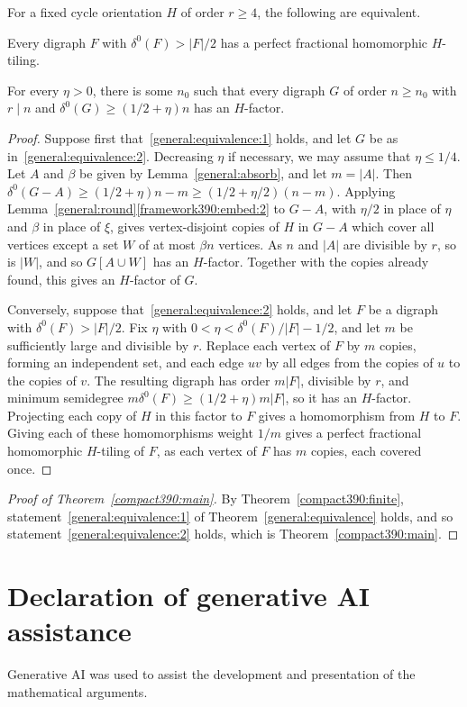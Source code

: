 \begin{theorem}\label{general:equivalence}
For a fixed cycle orientation $H$ of order $r\ge4$, the following
are equivalent.
\begin{props}
\item\label{general:equivalence:1} Every digraph $F$ with $\delta^0(F)>|F|/2$ has a perfect
fractional homomorphic $H$-tiling.
\item\label{general:equivalence:2} For every $\eta>0$, there is some $n_0$ such that every digraph $G$ of
order $n\ge n_0$ with $r\mid n$ and $\delta^0(G)\ge(1/2+\eta)n$ has an
$H$-factor.
\end{props}
\end{theorem}
\begin{proof}
Suppose first that~\ref{general:equivalence:1} holds, and let $G$ be as in~\ref{general:equivalence:2}. Decreasing $\eta$ if necessary, we may assume that $\eta\le1/4$. Let $A$ and $\beta$ be given by Lemma~\ref{general:absorb}, and let $m=|A|$. Then
$\delta^0(G-A)\ge(1/2+\eta)n-m\ge(1/2+\eta/2)(n-m)$.
Applying Lemma~\ref{general:round}\ref{framework390:embed:2} to $G-A$, with $\eta/2$ in place of $\eta$ and $\beta$ in place of $\xi$, gives vertex-disjoint copies of $H$ in $G-A$ which cover all vertices except a set $W$ of at most $\beta n$ vertices. As $n$ and $|A|$ are divisible by $r$, so is $|W|$, and so $G[A\cup W]$ has an $H$-factor. Together with the copies already found, this gives an $H$-factor of $G$.

Conversely, suppose that~\ref{general:equivalence:2} holds, and let $F$ be a digraph with $\delta^0(F)>|F|/2$. Fix $\eta$ with $0<\eta<\delta^0(F)/|F|-1/2$, and let $m$ be sufficiently large and divisible by $r$. Replace each
vertex of $F$ by $m$ copies, forming an independent set, and each edge $uv$ by all edges from the copies of $u$ to the copies of $v$. The resulting digraph has order $m|F|$, divisible by $r$, and minimum semidegree $m\delta^0(F)\ge(1/2+\eta)m|F|$, so it has an $H$-factor. Projecting each copy of $H$ in this factor to $F$ gives a homomorphism from $H$ to $F$. Giving each of these homomorphisms weight $1/m$ gives a perfect fractional homomorphic $H$-tiling of $F$, as each vertex of $F$ has $m$ copies, each covered once.
\end{proof}

\begin{proof}[Proof of Theorem~\ref{compact390:main}]
By Theorem~\ref{compact390:finite}, statement~\ref{general:equivalence:1} of Theorem~\ref{general:equivalence} holds, and so statement~\ref{general:equivalence:2} holds, which is Theorem~\ref{compact390:main}.
\end{proof}

\section*{Declaration of generative AI assistance}
Generative AI was used to assist the development and presentation of the mathematical arguments.
